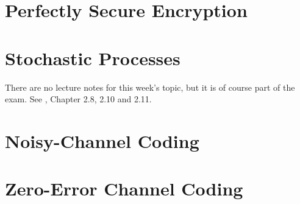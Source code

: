\documentclass[11pt,fleqn]{book} %
\begin{document}
\chapter{Perfectly Secure Encryption}


\chapter{Stochastic Processes}
There are no lecture notes for this week's topic, but it is of course part of the exam. See \CT, Chapter 2.8, 2.10 and 2.11.


\chapter{Noisy-Channel Coding}


\chapter{Zero-Error Channel Coding}


\end{document}

